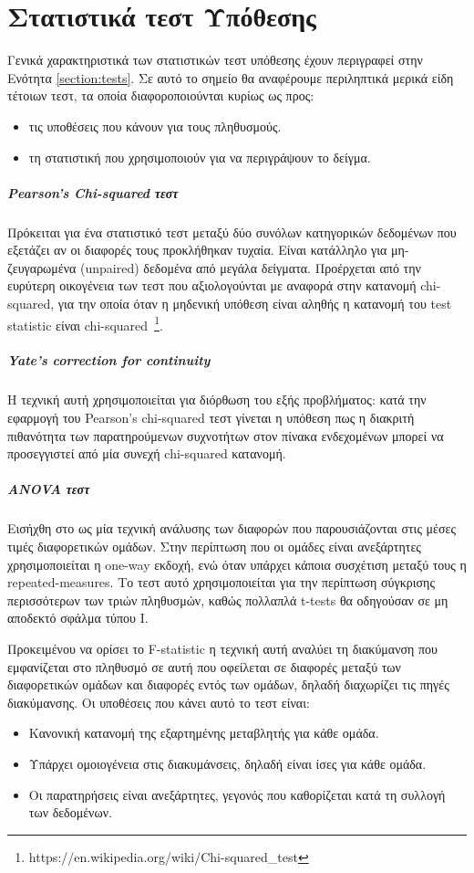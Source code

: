 \chapter{Στατιστικά τεστ Υπόθεσης}
\label{appendix:Tests}
Γενικά χαρακτηριστικά των στατιστικών τεστ υπόθεσης έχουν περιγραφεί στην Ενότητα \ref{section:tests}. Σε αυτό το σημείο θα αναφέρουμε περιληπτικά μερικά είδη τέτοιων τεστ, τα οποία διαφοροποιούνται κυρίως ως προς:
\begin{itemize}
	\item τις υποθέσεις που κάνουν για τους πληθυσμούς.
	\item τη στατιστική που χρησιμοποιούν για να περιγράψουν το δείγμα.
\end{itemize}
\paragraph{Pearson's Chi-squared τεστ}
Πρόκειται για ένα στατιστικό τεστ μεταξύ δύο συνόλων κατηγορικών δεδομένων που εξετάζει αν οι διαφορές τους προκλήθηκαν τυχαία. Είναι κατάλληλο για μη-ζευγαρωμένα (unpaired) δεδομένα από μεγάλα δείγματα. Προέρχεται από την ευρύτερη οικογένεια των τεστ που αξιολογούνται με αναφορά στην κατανομή chi-squared, για την οποία όταν η μηδενική υπόθεση είναι αληθής η κατανομή του test statistic είναι chi-squared~\footnote{https://en.wikipedia.org/wiki/Chi-squared\_test}. 
\paragraph{Yate's correction for continuity}
Η τεχνική αυτή χρησιμοποιείται για διόρθωση του εξής προβλήματος: κατά την εφαρμογή του Pearson's chi-squared τεστ γίνεται η υπόθεση πως η διακριτή πιθανότητα των παρατηρούμενων συχνοτήτων στον πίνακα ενδεχομένων μπορεί να προσεγγιστεί από μία συνεχή chi-squared κατανομή.
\paragraph{ANOVA τεστ} Εισήχθη στο \citet{QJ:QJ49708235130} ως μία τεχνική ανάλυσης των διαφορών που παρουσιάζονται στις μέσες τιμές διαφορετικών ομάδων. Στην περίπτωση που οι ομάδες είναι ανεξάρτητες χρησιμοποιείται η one-way εκδοχή, ενώ όταν υπάρχει κάποια συσχέτιση μεταξύ τους η repeated-measures. Το τεστ αυτό χρησιμοποιείται για την περίπτωση σύγκρισης περισσότερων των τριών πληθυσμών, καθώς πολλαπλά t-tests θα οδηγούσαν σε μη αποδεκτό σφάλμα τύπου Ι. 

Προκειμένου να ορίσει το F-statistic η τεχνική αυτή αναλύει τη διακύμανση που εμφανίζεται στο πληθυσμό σε αυτή που οφείλεται σε διαφορές μεταξύ των διαφορετικών ομάδων και διαφορές εντός των ομάδων, δηλαδή διαχωρίζει τις πηγές διακύμανσης. Οι υποθέσεις που κάνει αυτό το τεστ είναι:
\begin{itemize}
	\item Κανονική κατανομή της εξαρτημένης μεταβλητής για κάθε ομάδα.
	\item Υπάρχει ομοιογένεια στις διακυμάνσεις, δηλαδή είναι ίσες για κάθε ομάδα.
	\item Οι παρατηρήσεις είναι ανεξάρτητες, γεγονός που καθορίζεται κατά τη συλλογή των δεδομένων.
\end{itemize}

